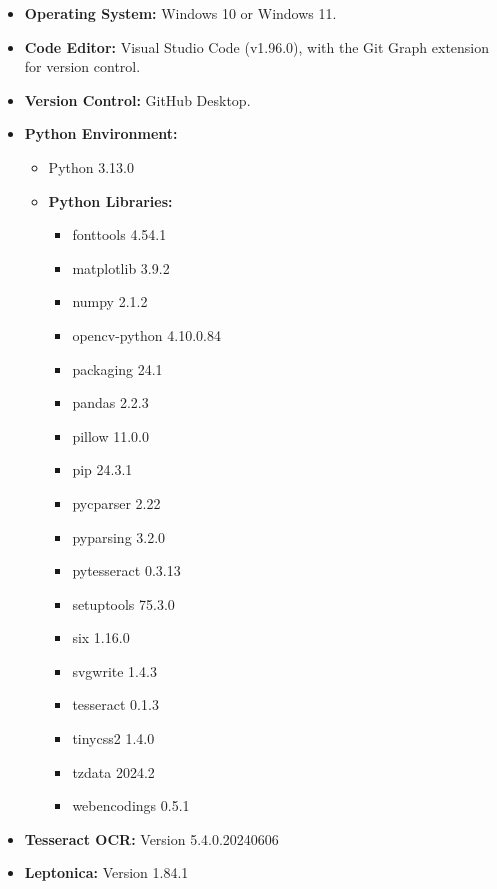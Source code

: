\documentclass[10pt,twocolumn]{article}
\begin{document}
\begin{itemize}
    \item \textbf{Operating System:} Windows 10 or Windows 11.
    \item \textbf{Code Editor:} Visual Studio Code (v1.96.0), with the Git Graph extension for version control.
    \item \textbf{Version Control:} GitHub Desktop.
    \item \textbf{Python Environment:}
    \begin{itemize}
        \item Python 3.13.0
        \item \textbf{Python Libraries:}
        \begin{itemize}
            \item fonttools 4.54.1
            \item matplotlib 3.9.2
            \item numpy 2.1.2
            \item opencv-python 4.10.0.84
            \item packaging 24.1
            \item pandas 2.2.3
            \item pillow 11.0.0
            \item pip 24.3.1
            \item pycparser 2.22
            \item pyparsing 3.2.0
            \item pytesseract 0.3.13
            \item setuptools 75.3.0
            \item six 1.16.0
            \item svgwrite 1.4.3
            \item tesseract 0.1.3
            \item tinycss2 1.4.0
            \item tzdata 2024.2
            \item webencodings 0.5.1
        \end{itemize}
    \end{itemize}
    \item \textbf{Tesseract OCR:} Version 5.4.0.20240606
    \item \textbf{Leptonica:} Version 1.84.1
\end{itemize}
\end{document}
